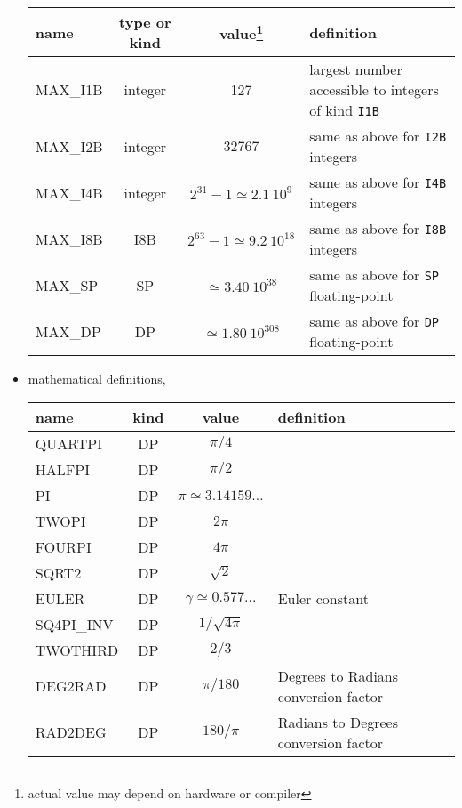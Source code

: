 \begin{itemize}
\begin{mytable}{%
\begin{tabularx}{\linewidth}{lcc X}
name & type or kind & value\footnote{\label{fn:healpix_types:max}actual value may depend on hardware or compiler} & definition \\
\hline
MAX\_I1B & integer & 127 & largest number accessible to integers of kind {\tt I1B}\\
MAX\_I2B & integer & $32767$ &
same as above for {\tt I2B} integers\\
MAX\_I4B & integer & $2^{31}-1 \simeq 2.1\ 10^9$& same as above for {\tt I4B} integers \\
MAX\_I8B & I8B & $2^{63}-1 \simeq 9.2\ 10^{18}$& same as above for {\tt I8B} integers \\
MAX\_SP & SP & $\simeq 3.40\ 10^{38}$ & same as above for {\tt SP} floating-point\\
MAX\_DP & DP & $\simeq 1.80\ 10^{308}$ & same as above for {\tt DP} floating-point\\
\hline
\end{tabularx}
}
\end{mytable}

\item
mathematical definitions, \\
\begin{mytable}{%
\begin{tabularx}{\linewidth}{lcc X}
name & kind & value & definition \\
\hline
QUARTPI & DP & $\pi/4$ & \\
HALFPI & DP & $\pi/2$ & \\
PI & DP & $\pi \simeq 3.14159\ldots$ & \\
TWOPI & DP & $2\pi$ & \\
FOURPI & DP & $4\pi$ & \\
SQRT2 & DP & $\sqrt{2}$ & \\
EULER & DP & $\gamma \simeq 0.577\ldots$ & Euler constant \\
SQ4PI\_INV & DP & $1/\sqrt{4\pi}$ & \\
TWOTHIRD & DP & $2/3$ & \\
DEG2RAD & DP & $\pi/180$ & Degrees to Radians conversion factor\\
RAD2DEG & DP & $180/\pi$ & Radians to Degrees conversion factor\\
\hline
\end{tabularx}
}
\end{mytable}


\end{itemize}

